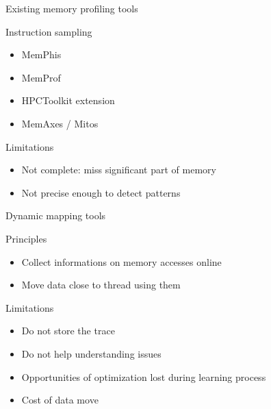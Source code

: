 \documentclass[xcolor={usenames,dvipsnames},hyperref={pdfusetitle}]{beamer}
\begin{document}
\begin{frame}{Existing memory profiling tools}
    \begin{block}{Instruction sampling~\cite{Drongowski07Instructionbased,Levinthal09Performance}}
        \begin{itemize}
            \item  MemPhis~\cite{McCurdy10Memphis}
            \item  MemProf~\cite{Lachaize12MemProf}
            \item  HPCToolkit extension~\cite{Liu14Tool}
            \item  MemAxes / Mitos~\cite{Gimenez14Dissecting}
        \end{itemize}
    \end{block}
    \pause
    \begin{alertblock}{Limitations}
        \begin{itemize}
            \item Not complete: miss significant part of memory
            \item Not precise enough to detect patterns
        \end{itemize}
    \end{alertblock}
\end{frame}

\begin{frame}{Dynamic mapping tools~\cite{Corbet12Toward,Diener14kMAF}}
    \begin{block}{Principles}
        \begin{itemize}
            \item Collect informations on memory accesses online
            \item Move data close to thread using them
        \end{itemize}
    \end{block}
    \pause
    \begin{alertblock}{Limitations}
        \begin{itemize}
            \item Do not store the trace
            \item Do not help understanding issues
            \item Opportunities of optimization lost during learning process
            \item Cost of data move
        \end{itemize}
    \end{alertblock}
\end{frame}
\end{document}
